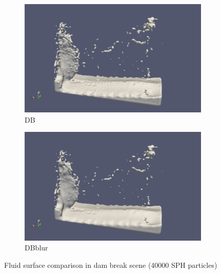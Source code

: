 \begin{figure}
	\begin{center}
        \begin{subfigure}[b]{\textwidth}
               \includegraphics[width=\textwidth]{figures/ReconstructionDencityBased.png}
				\caption{DB}
        \end{subfigure}
        \begin{subfigure}[b]{\textwidth}
               \includegraphics[width=\textwidth]{figures/ReconstructionDencityBasedBlur.png}
				\caption{DBblur}
        \end{subfigure}
	\end{center}
	\caption{Fluid surface comparison in dam break scene (40000 SPH particles)}
	\label{fig:DamBreak}
\end{figure}
